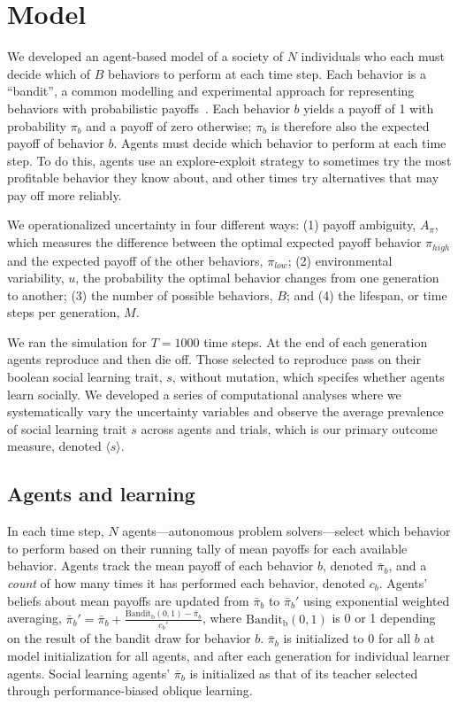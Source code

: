 \documentclass[letterpaper,11.5pt]{scrartcl}
\begin{document}
\section{Model}

We developed an agent-based model of a society of $N$ individuals who each must decide
which of $B$ behaviors to perform at each time step. Each behavior is a ``bandit'',
a common modelling and experimental approach for representing behaviors with
probabilistic payoffs~\cite{SuttonBartoBook, McElreath2005,Rendell2010,Schulz2019}. %
Each behavior $b$ yields a payoff of 1 with probability $\pi_b$ and a payoff of zero
otherwise; $\pi_b$ is therefore also the expected payoff of behavior $b$. Agents must
decide which behavior to perform at each time step. To do this, agents 
use an explore-exploit strategy to sometimes try the most profitable behavior
they know about, and other times try alternatives that may pay off more reliably. 

We operationalized uncertainty in four different ways: 
(1) payoff ambiguity, $A_\pi$, which measures the difference
between the optimal expected payoff behavior $\pi_{high}$ and the expected payoff
of the other behaviors, $\pi_{low}$; 
(2) environmental variability, $u$, the probability the optimal behavior changes from one generation to another; 
(3) the number of possible behaviors, $B$; and 
(4) the lifespan, or time steps per generation, $M$. 

We ran the simulation for $T=1000$ time steps. At
the end of each generation agents reproduce and then die off. 
Those selected to reproduce
pass on their boolean social learning trait, $s$, without mutation,
which specifes whether agents learn socially. We developed a series of
computational analyses where we systematically vary the uncertainty
variables and observe the average prevalence of social learning trait $s$
across agents and trials, which is our primary outcome measure, 
denoted $\langle s \rangle$. 

\subsection{Agents and learning}

In each time step, $N$ agents---autonomous problem solvers---select 
which behavior to perform based on their running tally of mean payoffs for 
each available behavior. %
Agents track the mean payoff of each behavior $b$, denoted $\bar\pi_b$, and a \emph{count} of how many times it has performed each behavior, denoted $c_b$. 
Agents' beliefs about mean payoffs are updated from $\bar\pi_b$ to $\bar\pi_b'$ using exponential weighted
averaging, $\bar\pi_b' = \bar\pi_b + \frac{\mathrm{Bandit_b(0, 1)} - \bar\pi_b}{c_b'}$, where
$\mathrm{Bandit_b(0, 1)}$ is 0 or 1 depending on the result of the bandit draw for behavior $b$. 
$\bar\pi_b$ is initialized to 0 for all $b$ at model initialization for
all agents, and after each generation for individual learner agents. Social
learning agents' $\bar\pi_b$ is initialized as that of its teacher selected
through performance-biased oblique learning.
\end{document}
